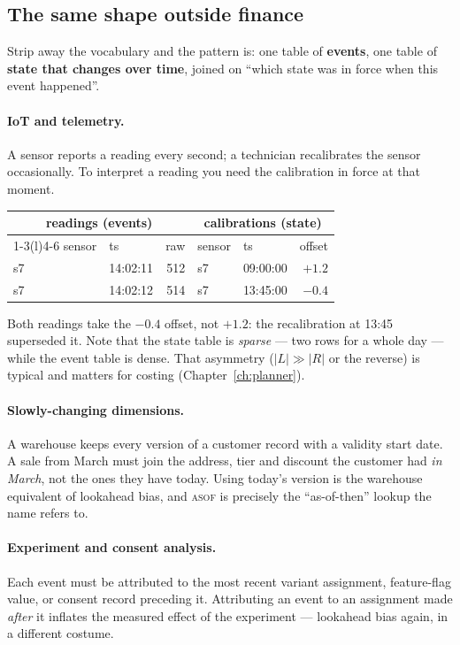 \documentclass[11pt,a4paper]{report}
\theoremstyle{definition}
\theoremstyle{plain}
\newcommand{\asof}{{\normalfont\scshape asof}}
\begin{document}
\subsection{The same shape outside finance}

Strip away the vocabulary and the pattern is: one table of \textbf{events}, one table of
\textbf{state that changes over time}, joined on ``which state was in force when this event
happened''.

\paragraph{IoT and telemetry.} A sensor reports a reading every second; a technician
recalibrates the sensor occasionally. To interpret a reading you need the calibration in
force at that moment.
\begin{center}\small
\begin{tabular}{@{}llr@{\qquad}llr@{}}
\toprule
\multicolumn{3}{c}{\textbf{readings} (events)} & \multicolumn{3}{c}{\textbf{calibrations} (state)}\\
\cmidrule(r){1-3}\cmidrule(l){4-6}
sensor & ts & raw & sensor & ts & offset\\
\midrule
s7 & 14:02:11 & 512 & s7 & 09:00:00 & $+1.2$\\
s7 & 14:02:12 & 514 & s7 & 13:45:00 & $-0.4$\\
\bottomrule
\end{tabular}
\end{center}
Both readings take the $-0.4$ offset, not $+1.2$: the recalibration at 13:45 superseded it.
Note that the state table is \emph{sparse} --- two rows for a whole day --- while the event
table is dense. That asymmetry ($|L| \gg |R|$ or the reverse) is typical and matters for
costing (Chapter~\ref{ch:planner}).

\paragraph{Slowly-changing dimensions.} A warehouse keeps every version of a customer
record with a validity start date. A sale from March must join the address, tier and
discount the customer had \emph{in March}, not the ones they have today. Using today's
version is the warehouse equivalent of lookahead bias, and \asof{} is precisely the
``as-of-then'' lookup the name refers to.

\paragraph{Experiment and consent analysis.} Each event must be attributed to the most
recent variant assignment, feature-flag value, or consent record preceding it. Attributing
an event to an assignment made \emph{after} it inflates the measured effect of the
experiment --- lookahead bias again, in a different costume.
\end{document}
